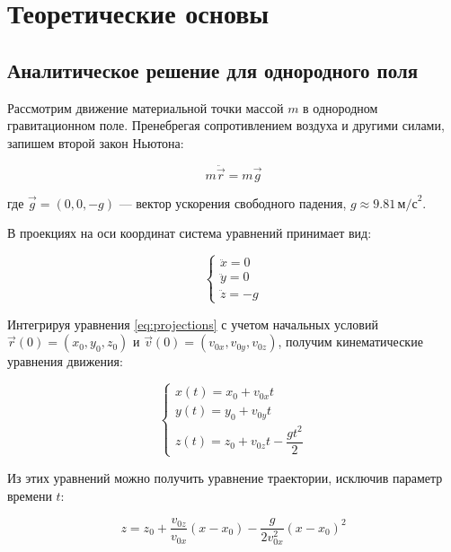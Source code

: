 \section{Теоретические основы}

\subsection{Аналитическое решение для однородного поля}

Рассмотрим движение материальной точки массой \(m\) в однородном гравитационном поле. Пренебрегая сопротивлением воздуха и другими силами, запишем второй закон Ньютона:

\begin{equation}
    m\ddot{\vec{r}} = m\vec{g}
    \label{eq:newton_law}
\end{equation}

где \(\vec{g} = (0, 0, -g)\) — вектор ускорения свободного падения, \(g \approx 9.81 \, \text{м/с}^2\).

В проекциях на оси координат система уравнений принимает вид:

\begin{equation}
\begin{cases}
    \ddot{x} = 0 \\
    \ddot{y} = 0 \\
    \ddot{z} = -g
\end{cases}
\label{eq:projections}
\end{equation}

Интегрируя уравнения \eqref{eq:projections} с учетом начальных условий \(\vec{r}(0) = (x_0, y_0, z_0)\) и \(\vec{v}(0) = (v_{0x}, v_{0y}, v_{0z})\), получим кинематические уравнения движения:

\begin{equation}
\begin{cases}
    x(t) = x_0 + v_{0x} t \\
    y(t) = y_0 + v_{0y} t \\
    z(t) = z_0 + v_{0z} t - \dfrac{g t^2}{2}
\end{cases}
\label{eq:kinematics}
\end{equation}

Из этих уравнений можно получить уравнение траектории, исключив параметр времени \(t\):

\begin{equation}
    z = z_0 + \frac{v_{0z}}{v_{0x}}(x - x_0) - \frac{g}{2 v_{0x}^2}(x - x_0)^2
    \label{eq:trajectory}
\end{equation}

